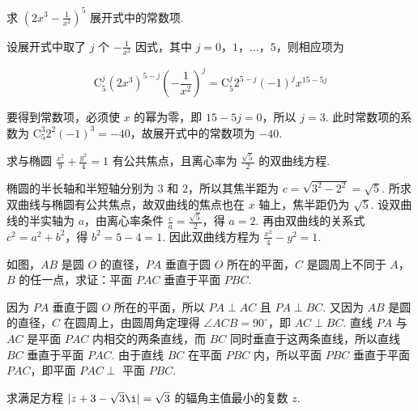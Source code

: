 \documentclass[UTF8,a4paper,oneside,11pt]{ctexbook}
\begin{document}
\begin{problem}
求 \(\left(2x^3 - \frac{1}{x^2}\right)^5\) 展开式中的常数项.
\end{problem}

\begin{solution}
设展开式中取了 \(j\) 个 \(-\frac{1}{x^2}\) 因式，其中 \(j=0\)，\(1\)，\(\ldots\)，\(5\)，则相应项为

\[
\mathrm C_5^j(2x^3)^{5-j}\left(-\frac{1}{x^2}\right)^j=\mathrm C_5^j2^{5-j}(-1)^j x^{15-5j}
\]

要得到常数项，必须使 \(x\) 的幂为零，即 \(15-5j=0\)，所以 \(j=3\). 此时常数项的系数为 \(\mathrm C_5^3 2^2(-1)^3=-40\)，故展开式中的常数项为 \(-40\).
\end{solution}

\begin{problem}
求与椭圆 \(\frac{x^2}{9} + \frac{y^2}{4} = 1\) 有公共焦点，且离心率为 \(\frac{\sqrt{5}}{2}\) 的双曲线方程.
\end{problem}

\begin{solution}
椭圆的半长轴和半短轴分别为 \(3\) 和 \(2\)，所以其焦半距为 \(c=\sqrt{3^2-2^2}=\sqrt{5}\). 所求双曲线与椭圆有公共焦点，故双曲线的焦点也在 \(x\) 轴上，焦半距仍为 \(\sqrt{5}\). 设双曲线的半实轴为 \(a\)，由离心率条件 \(\frac{c}{a}=\frac{\sqrt{5}}{2}\)，得 \(a=2\). 再由双曲线的关系式 \(c^2=a^2+b^2\)，得 \(b^2=5-4=1\). 因此双曲线方程为 \(\frac{x^2}{4}-y^2=1\).
\end{solution}

\begin{problem}
如图，\(AB\) 是圆 \(O\) 的直径，\(PA\) 垂直于圆 \(O\) 所在的平面，\(C\) 是圆周上不同于 \(A\)，\(B\) 的任一点，求证：平面 \(PAC\) 垂直于平面 \(PBC\).

\end{problem}

\begin{solution}
因为 \(PA\) 垂直于圆 \(O\) 所在的平面，所以 \(PA\perp AC\) 且 \(PA\perp BC\). 又因为 \(AB\) 是圆的直径，\(C\) 在圆周上，由圆周角定理得 \(\angle ACB=90^{\circ}\)，即 \(AC\perp BC\). 直线 \(PA\) 与 \(AC\) 是平面 \(PAC\) 内相交的两条直线，而 \(BC\) 同时垂直于这两条直线，所以直线 \(BC\) 垂直于平面 \(PAC\). 由于直线 \(BC\) 在平面 \(PBC\) 内，所以平面 \(PBC\) 垂直于平面 \(PAC\)，即平面 \(PAC\perp\) 平面 \(PBC\).
\end{solution}

\begin{problem}
求满足方程 \(|z + 3 - \sqrt{3}\i| = \sqrt{3}\) 的辐角主值最小的复数 \(z\).
\end{problem}
\end{document}
